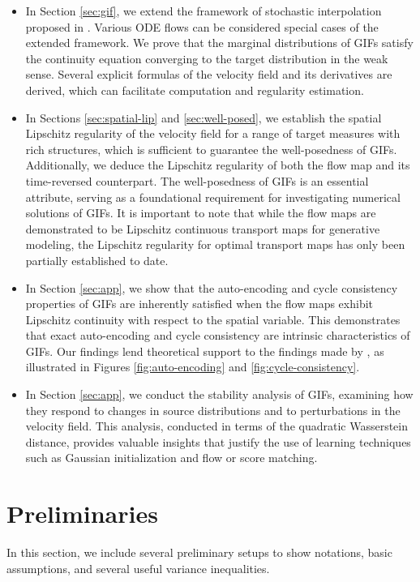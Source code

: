 \documentclass[twoside,11pt]{article}
\numberwithin{equation}{section}
\begin{document}
\begin{itemize}
\item
In Section \ref{sec:gif}, we extend the framework of stochastic interpolation proposed in \citet{albergo2023building}. Various ODE flows can be considered special cases of the extended framework. We prove that the marginal distributions of GIFs satisfy the continuity equation converging to the target distribution in the weak sense. Several explicit formulas of the velocity field and its derivatives are derived, which can facilitate computation and regularity estimation.

\item
In Sections \ref{sec:spatial-lip} and \ref{sec:well-posed}, we establish the spatial Lipschitz regularity of the velocity field for a range of target measures with rich structures, which is sufficient to guarantee the well-posedness of GIFs. Additionally, we deduce the Lipschitz regularity of both the flow map and its time-reversed counterpart. The well-posedness of GIFs is an essential attribute, serving as a foundational requirement for investigating numerical solutions of GIFs. It is important to note that while the flow maps are demonstrated to be Lipschitz continuous transport maps for generative modeling, the Lipschitz regularity for optimal transport maps has only been partially established to date.

\item
In Section \ref{sec:app}, we show that the auto-encoding and cycle consistency properties of GIFs are inherently satisfied when the flow maps exhibit Lipschitz continuity with respect to the spatial variable. This demonstrates that exact auto-encoding and cycle consistency are intrinsic characteristics of GIFs. Our findings lend theoretical support to the findings made by \citet{su2023dual}, as illustrated in Figures \ref{fig:auto-encoding} and \ref{fig:cycle-consistency}.

\item In Section \ref{sec:app}, we conduct the stability analysis of GIFs, examining how they respond
to changes in source distributions and to perturbations in the velocity field. This analysis, conducted in terms of the quadratic Wasserstein distance, provides valuable insights that justify the use of learning techniques such as Gaussian initialization and flow or score matching.
\end{itemize}

\section{Preliminaries}
In this section, we include several preliminary setups to show notations, basic assumptions, and several useful variance inequalities.
\end{document}
